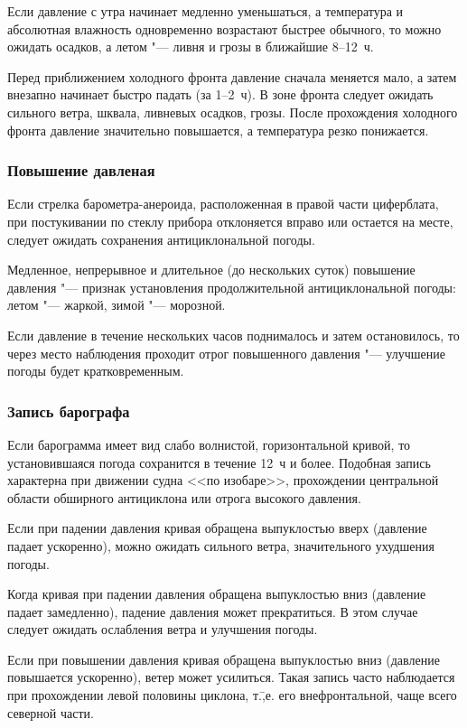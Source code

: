  Если давление с утра начинает медленно уменьшаться, а
температура и абсолютная влажность одновременно возрастают быстрее
обычного, то можно ожидать осадков, а летом "--- ливня и грозы в
ближайшие 8--12~ч.

 Перед приближением холодного фронта давление сначала меняется
мало, а затем внезапно начинает быстро падать (за 1--2~ч). В зоне
фронта следует ожидать сильного ветра, шквала, ливневых осадков,
грозы. После прохождения холодного фронта давление значительно
повышается, а температура резко понижается.

\subsubsection{Повышение давленая}

 Если стрелка барометра-анероида, расположенная в правой части
циферблата, при постукивании по стеклу прибора отклоняется вправо или
остается на месте, следует ожидать сохранения антициклональной погоды.

 Медленное, непрерывное и длительное (до нескольких суток)
повышение давления "--- признак установления продолжительной
антициклональной погоды: летом "--- жаркой, зимой "--- морозной.

 Если давление в течение нескольких часов поднималось и затем
остановилось, то через место наблюдения проходит отрог повышенного
давления "--- улучшение погоды будет кратковременным.

\subsubsection{Запись барографа}

 Если барограмма имеет вид слабо волнистой, горизонтальной
кривой, то установившаяся погода сохранится в течение 12~ч и
более. Подобная запись характерна при движении судна <<по изобаре>>,
прохождении центральной области обширного антициклона или отрога
высокого давления.

 Если при падении давления кривая обращена выпуклостью вверх
(давление падает ускоренно), можно ожидать сильного ветра,
значительного ухудшения погоды.

 Когда кривая при падении давления обращена выпуклостью вниз
(давление падает замедленно), падение давления может прекратиться. В
этом случае следует ожидать ослабления ветра и улучшения погоды.

 Если при повышении давления кривая обращена выпуклостью вниз
(давление повышается ускоренно), ветер может усилиться. Такая запись
часто наблюдается при прохождении левой половины циклона, т.\=,е. его
внефронтальной, чаще всего северной части.

